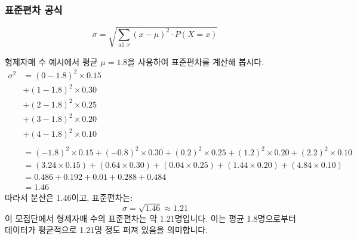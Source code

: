 \documentclass[11pt,a4paper]{book}
\theoremstyle{definition}
\begin{document}
\subsubsection*{표준편차 공식}
\[ \sigma = \sqrt{\sum_{\text{all } x} (x - \mu)^2 \cdot P(X=x)} \]

\begin{examplebox}[title={표준편차 계산 예시: 형제자매 수}]
형제자매 수 예시에서 평균 \(\mu = 1.8\)을 사용하여 표준편차를 계산해 봅시다.
\begin{align*} \sigma^2 &= (0 - 1.8)^2 \times 0.15 \\ &+ (1 - 1.8)^2 \times 0.30 \\ &+ (2 - 1.8)^2 \times 0.25 \\ &+ (3 - 1.8)^2 \times 0.20 \\ &+ (4 - 1.8)^2 \times 0.10 \\ \\ &= (-1.8)^2 \times 0.15 + (-0.8)^2 \times 0.30 + (0.2)^2 \times 0.25 + (1.2)^2 \times 0.20 + (2.2)^2 \times 0.10 \\ &= (3.24 \times 0.15) + (0.64 \times 0.30) + (0.04 \times 0.25) + (1.44 \times 0.20) + (4.84 \times 0.10) \\ &= 0.486 + 0.192 + 0.01 + 0.288 + 0.484 \\ &= 1.46 \end{align*}
따라서 분산은 1.46이고, 표준편차는:
\[ \sigma = \sqrt{1.46} \approx 1.21 \]
이 모집단에서 형제자매 수의 표준편차는 약 1.21명입니다. 이는 평균 1.8명으로부터 데이터가 평균적으로 1.21명 정도 퍼져 있음을 의미합니다.
\end{examplebox}
\end{document}
